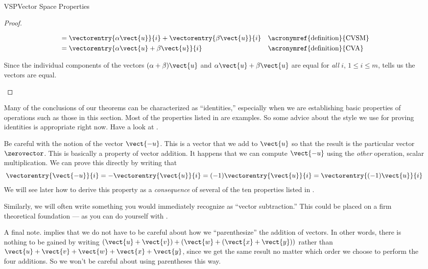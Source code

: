 \begin{subsect}{VSP}{Vector Space Properties}
\begin{proof}
\begin{para}
\begin{align*}
%
&=\vectorentry{\alpha\vect{u}}{i}+\vectorentry{\beta\vect{u}}{i}
&&\text{\acronymref{definition}{CVSM}}\\
%
&=\vectorentry{\alpha\vect{u}+\beta\vect{u}}{i}
&&\text{\acronymref{definition}{CVA}}\\
%
\end{align*}
\end{para}
%
\begin{para}Since the individual components of the vectors $(\alpha+\beta)\vect{u}$ and $\alpha\vect{u}+\beta\vect{u}$ are equal for {\em all} $i$, $1\leq i\leq m$,  tells us the vectors are equal.\end{para}
%
\end{proof}
%
\begin{para}Many of the conclusions of our theorems can be characterized as ``identities,''  especially when we are establishing basic properties of operations such as those in this section.  Most of the properties listed in  are examples.  So some advice about the style we use for proving identities is appropriate right now.  Have a look at .\end{para}
%
\begin{para}Be careful with the notion of the vector $\vect{-u}$.  This is a vector that we add to $\vect{u}$ so that the result is the particular vector $\zerovector$.  This is basically a property of vector addition.  It happens that we can compute $\vect{-u}$ using the {\em other} operation, scalar multiplication.  We can prove this directly by writing that
%
\begin{equation*}
\vectorentry{\vect{-u}}{i}
=-\vectorentry{\vect{u}}{i}
=(-1)\vectorentry{\vect{u}}{i}
=\vectorentry{(-1)\vect{u}}{i}
\end{equation*}
%
We will see later how to derive this property as a {\em consequence} of several of the ten properties listed in .
\end{para}
%
\begin{para}Similarly, we will often write something you would immediately recognize as ``vector subtraction.''  This could be placed on a firm theoretical foundation --- as you can do yourself with .\end{para}
%
\begin{para}A final note.   implies that we do not have to be careful about how we ``parenthesize'' the addition of vectors.  In other words, there is nothing to be gained by writing
$\left(\vect{u}+\vect{v}\right)+\left(\vect{w}+\left(\vect{x}+\vect{y}\right)\right)$
rather than
$\vect{u}+\vect{v}+\vect{w}+\vect{x}+\vect{y}$, since we get the same result no matter which order we choose to perform the four additions.  So we won't be careful about using parentheses this way.\end{para}
%
%
\end{subsect}

